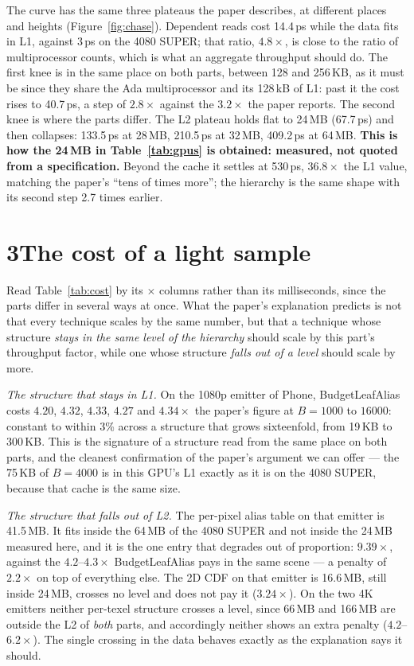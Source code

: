 \documentclass[10pt]{article}
\begin{document}
The curve has the same three plateaus the paper describes, at different places and heights
(Figure~\ref{fig:chase}). Dependent reads cost 14.4\,ps while the data fits in L1, against 3\,ps on
the 4080 SUPER; that ratio, $4.8\times$, is close to the ratio of multiprocessor counts, which is
what an aggregate throughput should do. The first knee is in the same place on both parts, between
128 and 256\,KB, as it must be since they share the Ada multiprocessor and its 128\,kB of L1: past it
the cost rises to 40.7\,ps, a step of $2.8\times$ against the $3.2\times$ the paper reports. The
second knee is where the parts differ. The L2 plateau holds flat to 24\,MB (67.7\,ps) and then
collapses: 133.5\,ps at 28\,MB, 210.5\,ps at 32\,MB, 409.2\,ps at 64\,MB. \textbf{This is how the
24\,MB in Table~\ref{tab:gpus} is obtained: measured, not quoted from a specification.} Beyond the
cache it settles at 530\,ps, $36.8\times$ the L1 value, matching the paper's ``tens of times more'';
the hierarchy is the same shape with its second step 2.7 times earlier.

\section*{3\quad The cost of a light sample}



Read Table~\ref{tab:cost} by its $\times$ columns rather than its milliseconds, since the parts
differ in several ways at once. What the paper's explanation predicts is not that every technique
scales by the same number, but that a technique whose structure \emph{stays in the same level of the
hierarchy} should scale by this part's throughput factor, while one whose structure \emph{falls out
of a level} should scale by more.

\emph{The structure that stays in L1.} On the 1080p emitter of Phone, BudgetLeafAlias costs $4.20$,
$4.32$, $4.33$, $4.27$ and $4.34\times$ the paper's figure at $B=1000$ to $16000$: constant to within
3\% across a structure that grows sixteenfold, from 19\,KB to 300\,KB. This is the signature of a
structure read from the same place on both parts, and the cleanest confirmation of the paper's
argument we can offer --- the 75\,KB of $B=4000$ is in this GPU's L1 exactly as it is on the 4080
SUPER, because that cache is the same size.

\emph{The structure that falls out of L2.} The per-pixel alias table on that emitter is 41.5\,MB. It
fits inside the 64\,MB of the 4080 SUPER and not inside the 24\,MB measured here, and it is the one
entry that degrades out of proportion: $9.39\times$, against the $4.2$--$4.3\times$ BudgetLeafAlias
pays in the same scene --- a penalty of $2.2\times$ on top of everything else. The 2D CDF on that
emitter is 16.6\,MB, still inside 24\,MB, crosses no level and does not pay it ($3.24\times$). On the
two 4K emitters neither per-texel structure crosses a level, since 66\,MB and 166\,MB are outside the
L2 of \emph{both} parts, and accordingly neither shows an extra penalty ($4.2$--$6.2\times$). The
single crossing in the data behaves exactly as the explanation says it should.
\end{document}
